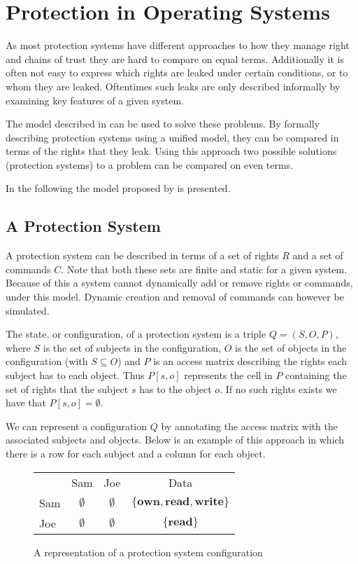 \section{Protection in Operating Systems}
As most protection systems have different approaches to how they manage right and chains of trust they are hard to compare on equal terms.
Additionally it is often not easy to express which rights are leaked under certain conditions, or to whom they are leaked.
Oftentimes such leaks are only described informally by examining key features of a given system.

The model described in \cite{HRU} can be used to solve these problems.
By formally describing protection systems using a unified model, they can be compared in terms of the rights that they leak.
Using this approach two possible solutions (protection systems) to a problem can be compared on even terms.

In the following the model proposed by \cite{HRU} is presented.

\subsection{A Protection System}
A protection system can be described in terms of a set of rights $R$ and a set of commands $C$.
Note that both these sets are finite and static for a given system.
Because of this a system cannot dynamically add or remove rights or commands, under this model.
Dynamic creation and removal of commands can however be simulated.

The state, or configuration, of a protection system is a triple $Q = (S, O, P)$, where $S$ is the set of subjects in the configuration, $O$ is the set of objects in the configuration (with $S \subseteq O$) and $P$ is an access matrix describing the rights each subject has to each object.
Thus $P[s, o]$ represents the cell in $P$ containing the set of rights that the subject $s$ has to the object $o$.
If no such rights exists we have that $P[s,o] = \emptyset$.

We can represent a configuration $Q$ by annotating the access matrix with the associated subjects and objects.
Below is an example of this approach in which there is a row for each subject and a column for each object.

\begin{figure}
\centering
\begin{tabular}{l|c|c|c|}
\multicolumn{1}{c}{} & \multicolumn{1}{c}{Sam} & \multicolumn{1}{c}{Joe} & \multicolumn{1}{c}{Data} \\\cline{2-4}
Sam & $\emptyset$ & $\emptyset$ & $\{\textbf{own}, \textbf{read}, \textbf{write}\}$ \\\cline{2-4}
Joe & $\emptyset$ & $\emptyset$ & $\{\textbf{read}\}$ \\\cline{2-4}
\end{tabular}
\caption{A representation of a protection system configuration}
\label{protection:matrixsmall}
\end{figure}

